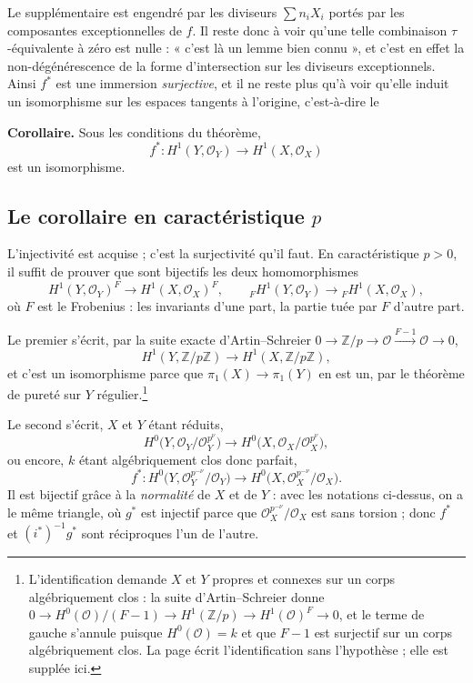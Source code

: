 \documentclass[11pt,a4paper]{article}
\begin{document}
Le supplémentaire est engendré par les diviseurs $\sum n_{i} X_{i}$ portés par
les composantes exceptionnelles de $f$. Il reste donc à voir qu'une telle
combinaison $\tau$-équivalente à zéro est nulle : « c'est là un lemme bien
connu », et c'est en effet la non-dégénérescence de la forme d'intersection sur
les diviseurs exceptionnels. Ainsi $f^{*}$ est une immersion \emph{surjective},
et il ne reste plus qu'à voir qu'elle induit un isomorphisme sur les espaces
tangents à l'origine, c'est-à-dire le

\textbf{Corollaire.} Sous les conditions du théorème,
\[
  f^{*} : H^{1}(Y, \mathcal{O}_{Y}) \longrightarrow H^{1}(X, \mathcal{O}_{X})
\]
est un isomorphisme.

\subsection*{Le corollaire en caractéristique $p$}

L'injectivité est acquise ; c'est la surjectivité qu'il faut. En caractéristique
$p > 0$, il suffit de prouver que sont bijectifs les deux homomorphismes
\[
  H^{1}(Y, \mathcal{O}_{Y})^{F} \longrightarrow H^{1}(X, \mathcal{O}_{X})^{F} ,
  \qquad
  {}_{F}H^{1}(Y, \mathcal{O}_{Y}) \longrightarrow
  {}_{F}H^{1}(X, \mathcal{O}_{X}) ,
\]
où $F$ est le Frobenius : les invariants d'une part, la partie tuée par $F$
d'autre part.

Le premier s'écrit, par la suite exacte d'Artin--Schreier
$0 \to \mathbb{Z}/p \to \mathcal{O} \xrightarrow{F-1} \mathcal{O} \to 0$,
\[
  H^{1}(Y, \mathbb{Z}/p\mathbb{Z}) \longrightarrow
  H^{1}(X, \mathbb{Z}/p\mathbb{Z}) ,
\]
et c'est un isomorphisme parce que $\pi_{1}(X) \to \pi_{1}(Y)$ en est un, par
le théorème de pureté sur $Y$ régulier.\footnote{L'identification demande
$X$ et $Y$ propres et connexes sur un corps algébriquement clos : la suite
d'Artin--Schreier donne
$0 \to H^{0}(\mathcal{O})/(F-1) \to H^{1}(\mathbb{Z}/p) \to
H^{1}(\mathcal{O})^{F} \to 0$, et le terme de gauche s'annule puisque
$H^{0}(\mathcal{O}) = k$ et que $F-1$ est surjectif sur un corps
algébriquement clos. La page écrit l'identification sans l'hypothèse ; elle est
supplée ici.}

Le second s'écrit, $X$ et $Y$ étant réduits,
\[
  H^{0}\bigl(Y, \mathcal{O}_{Y}/\mathcal{O}_{Y}^{p^{\nu}}\bigr) \longrightarrow
  H^{0}\bigl(X, \mathcal{O}_{X}/\mathcal{O}_{X}^{p^{\nu}}\bigr) ,
\]
ou encore, $k$ étant algébriquement clos donc parfait,
\[
  f^{*} : H^{0}\bigl(Y, \mathcal{O}_{Y}^{p^{-\nu}}/\mathcal{O}_{Y}\bigr)
  \longrightarrow
  H^{0}\bigl(X, \mathcal{O}_{X}^{p^{-\nu}}/\mathcal{O}_{X}\bigr) .
\]
Il est bijectif grâce à la \emph{normalité} de $X$ et de $Y$ : avec les
notations ci-dessus, on a le même triangle, où $g^{*}$ est injectif parce que
$\mathcal{O}_{X}^{p^{-\nu}}/\mathcal{O}_{X}$ est sans torsion ; donc $f^{*}$ et
$(i^{*})^{-1}g^{*}$ sont réciproques l'un de l'autre.
\end{document}
